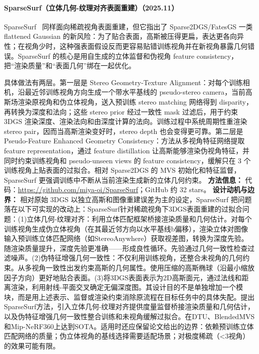 \paragraph{SparseSurf（立体几何-纹理对齐表面重建）（2025.11）}
SparseSurf~\cite{2511_14633} 同样面向稀疏视角表面重建，但它指出了 Sparse2DGS/FatesGS 一类 flattened Gaussian 的新风险：为了贴合表面，高斯被压得更扁，表达更各向异性；在视角少时，这种强表面假设反而更容易贴错训练视角并在新视角暴露几何错误。SparseSurf 的核心是用自生成的立体监督和伪视角 feature consistency，把“渲染质量”和“表面几何”绑在一起优化。

具体做法有两层。第一层是 Stereo Geometry-Texture Alignment：对每个训练相机，沿最近邻训练视角方向生成一个带水平基线的 pseudo-stereo camera，当前高斯场渲染原视角和伪立体视角，送入预训练 stereo matching 网络得到 disparity，再转换为深度和法向；这些 stereo prior 经过一致性 mask 过滤后，用于约束 3DGS 渲染深度、渲染法向和由深度计算的法向。训练过程中系统周期性重渲染 stereo pair，因而当高斯渲染变好时，stereo depth 也会变得更可靠。第二层是 Pseudo-Feature Enhanced Geometry Consistency：方法从多视角特征网络提取 feature representation，通过 feature distillation 让高斯能够渲染伪视角特征，并同时约束训练视角和 pseudo-unseen views 的 feature consistency，缓解只在 3 个训练视角上贴表面的过拟合。相对 Sparse2DGS 的 MVS 初始化和特征监督，SparseSurf 更强调训练中不断从当前渲染生成新的立体几何约束。
\textbf{方法信息：} 代码：\url{https://github.com/miya-oi/SparseSurf}；GitHub 约 32 stars。
\textbf{设计动机与边界：} 相对原始 3DGS 以独立高斯和图像重建误差为主的设定，SparseSurf 把问题落在以下可实现的改动上：SparseSurf针对稀疏视角下3DGS表面重建的过拟合问题：(1)立体几何-纹理对齐：利用立体匹配框架桥接渲染质量和几何估计。对每个训练视角生成伪立体视角（在其最近邻方向以水平基线b偏移），渲染立体对图像输入预训练立体匹配网络（如StereoAnywhere）获取视差图，转换为深度先验。随渲染质量提升，深度先验更准确——形成良性循环。先验通过几何一致性检查过滤噪声。(2)伪特征增强几何一致性：不仅利用训练视角，还整合未视角的几何约束。从多视角一致性出发约束高斯的几何属性。使用压缩的高斯椭球（沿最小缩放因子方向）更好地贴合表面。(3)将3DGS表面表示为2D高斯面元，通过法线和距离渲染，利用射线-平面交叉确定无偏深度图。其设计目的不是单独增加一个模块，而是用上述表示、监督或渲染约束消除原流程在目标任务中的具体失配。提出SparseSurf方法，引入立体几何-纹理对齐提供度量监督桥接渲染质量和几何估计，以及伪特征增强几何一致性整合训练和未视角缓解过拟合。在DTU、BlendedMVS和Mip-NeRF360上达到SOTA。适用时还应保留论文给出的边界：依赖预训练立体匹配网络的质量；伪立体视角的基线选择需要适配场景；对极度稀疏（<3视角）的效果可能有限。
